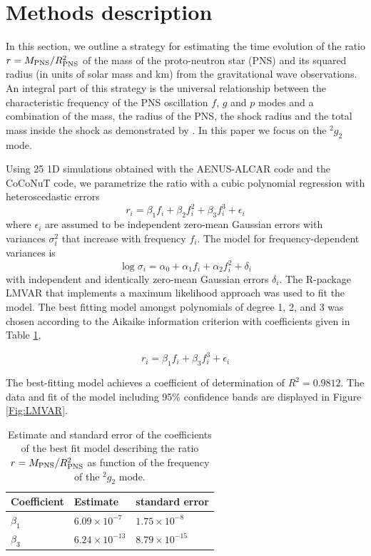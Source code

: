 \section{Methods description}
In this section, we outline a strategy for estimating the time evolution of the ratio $r=M_{\rm PNS}/R_{\rm PNS}^2$ of the mass of the proto-neutron star (PNS) and its squared radius (in units of solar mass and km) from the gravitational wave observations.
An integral part of this strategy is the universal relationship between the characteristic frequency of the PNS oscillation $f$, $g$ and $p$ modes and a combination of the mass, the radius of the PNS, the shock radius and the total mass inside the shock as demonstrated by \cite{Torres:2019}. In this paper we focus on the $^2g_2$ mode. 

Using 25 1D simulations obtained with the {\sc AENUS-ALCAR }code \cite{} and the {\sc CoCoNuT} \cite{} code, we parametrize the ratio with a cubic polynomial regression with heteroscedastic errors
\begin{equation}
r_i=\beta_1 f_i + \beta_2 f_i^2 +\beta_3 f_i^3 + \epsilon_i
\end{equation}
where $\epsilon_i$ are assumed to be independent zero-mean Gaussian errors with  variances $\sigma_i^2$ that increase with frequency $f_i$. The model for frequency-dependent variances is
\begin{equation}
\log \sigma_i=\alpha_0+ \alpha_1 f_i + \alpha_2 f_i^2 + \delta_i
\end{equation}
with independent and identically zero-mean Gaussian errors $\delta_i$. The R-package LMVAR
\cite{lmvar:2019} that implements a maximum likelihood approach was used to fit the model. The best
fitting model amongst polynomials of degree 1, 2, and 3  was chosen according to the Aikaike information
criterion with coefficients given in Table \ref{tab:model},

\begin{equation}\label{eq:universal}
r_i = \beta_1 f_i + \beta_3 f_i^3 + \epsilon_i
\end{equation}

The best-fitting model achieves a coefficient of determination of $R^2=0.9812$.
The data and fit of the model including 95\% confidence bands are displayed in Figure \ref{Fig:LMVAR}.

\begin{table}[h]
  \begin{tabular}{lll}
    \hline
    Coefficient & Estimate & standard error \\
    \hline
    $\beta_1$   & $6.09 \times 10^{-7}$ & $1.75 \times 10^{-8}$ \\
    $\beta_3$   & $6.24 \times 10^{-13}$ & $8.79 \times 10^{-15}$ \\
    \hline
  \end{tabular}
\label{tab:model}
\caption{Estimate and standard error of the coefficients of the best fit model describing the ratio $r=M_{\rm PNS}/R_{\rm PNS}^2$ as function of the frequency of the $^2g_2$ mode.}
\end{table}

